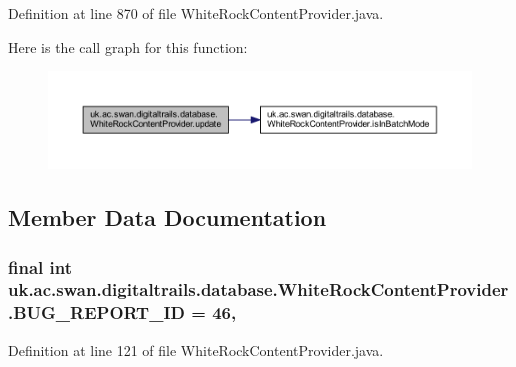 Definition at line 870 of file White\+Rock\+Content\+Provider.\+java.



Here is the call graph for this function\+:
\nopagebreak
\begin{figure}[H]
\begin{center}
\leavevmode
\includegraphics[width=350pt]{classuk_1_1ac_1_1swan_1_1digitaltrails_1_1database_1_1_white_rock_content_provider_a27b0a0434512cc107c55c205b244c086_cgraph}
\end{center}
\end{figure}




\subsection{Member Data Documentation}
\hypertarget{classuk_1_1ac_1_1swan_1_1digitaltrails_1_1database_1_1_white_rock_content_provider_a0c9d73ead8fa3e8a459398ef49f7e5a9}{
\subsubsection[{B\+U\+G\+\_\+\+R\+E\+P\+O\+R\+T\+\_\+\+I\+D}]{\setlength{\rightskip}{0pt plus 5cm}final int uk.\+ac.\+swan.\+digitaltrails.\+database.\+White\+Rock\+Content\+Provider.\+B\+U\+G\+\_\+\+R\+E\+P\+O\+R\+T\+\_\+\+I\+D = 46\hspace{0.3cm}{\ttfamily [static]}, {\ttfamily [private]}}}\label{classuk_1_1ac_1_1swan_1_1digitaltrails_1_1database_1_1_white_rock_content_provider_a0c9d73ead8fa3e8a459398ef49f7e5a9}


Definition at line 121 of file White\+Rock\+Content\+Provider.\+java.

